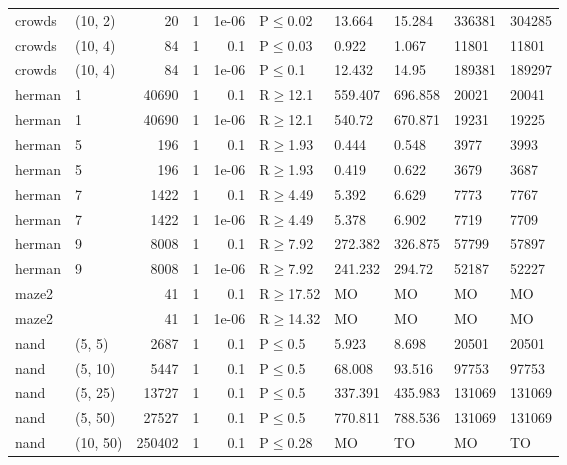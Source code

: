 \begin{longtable}{llrrrlllll}
 crowds        & (10, 2)   &     	20 & 1 & 1e-06 & P$\leq$0.02  & 13.664  & 15.284  & 336381  & 304285  \\
 crowds        & (10, 4)   &     	84 & 1 & 0.1   & P$\leq$0.03  & 0.922   & 1.067   & 11801   & 11801   \\
 crowds        & (10, 4)   &     	84 & 1 & 1e-06 & P$\leq$0.1   & 12.432  & 14.95   & 189381  & 189297  \\
 herman        & 1         &  	40690 & 1 & 0.1   & R$\geq$12.1  & 559.407 & 696.858 & 20021   & 20041   \\
 herman        & 1         &  	40690 & 1 & 1e-06 & R$\geq$12.1  & 540.72  & 670.871 & 19231   & 19225   \\
 herman        & 5         &    	196 & 1 & 0.1   & R$\geq$1.93  & 0.444   & 0.548   & 3977    & 3993    \\
 herman        & 5         &    	196 & 1 & 1e-06 & R$\geq$1.93  & 0.419   & 0.622   & 3679    & 3687    \\
 herman        & 7         &   	1422 & 1 & 0.1   & R$\geq$4.49  & 5.392   & 6.629   & 7773    & 7767    \\
 herman        & 7         &   	1422 & 1 & 1e-06 & R$\geq$4.49  & 5.378   & 6.902   & 7719    & 7709    \\
 herman        & 9         &   	8008 & 1 & 0.1   & R$\geq$7.92  & 272.382 & 326.875 & 57799   & 57897   \\
 herman        & 9         &   	8008 & 1 & 1e-06 & R$\geq$7.92  & 241.232 & 294.72  & 52187   & 52227   \\
 maze2         &           &     	41 & 1 & 0.1   & R$\geq$17.52 & MO      & MO      & MO      & MO      \\
 maze2         &           &     	41 & 1 & 1e-06 & R$\geq$14.32 & MO      & MO      & MO      & MO      \\
 nand          & (5, 5)    &   	2687 & 1 & 0.1   & P$\leq$0.5   & 5.923   & 8.698   & 20501   & 20501   \\
 nand          & (5, 10)   &   	5447 & 1 & 0.1   & P$\leq$0.5   & 68.008  & 93.516  & 97753   & 97753   \\
 nand          & (5, 25)   &  	13727 & 1 & 0.1   & P$\leq$0.5   & 337.391 & 435.983 & 131069  & 131069  \\
 nand          & (5, 50)   &  	27527 & 1 & 0.1   & P$\leq$0.5   & 770.811 & 788.536 & 131069  & 131069  \\
 nand          & (10, 50)  & 	250402 & 1 & 0.1   & P$\leq$0.28  & MO      & TO      & MO      & TO      \\

\end{longtable}
